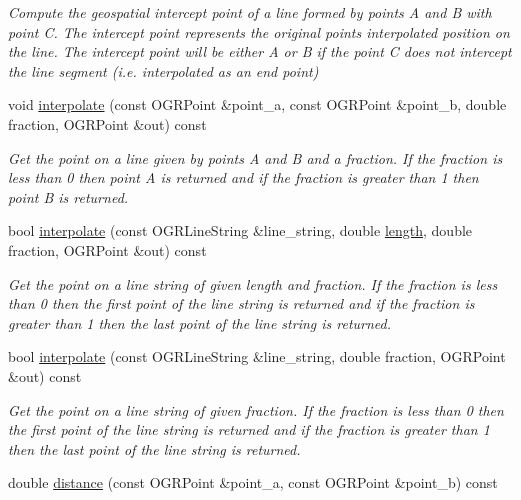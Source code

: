 \begin{DoxyCompactItemize}
\begin{DoxyCompactList}\small\item\em Compute the geospatial intercept point of a line formed by points A and B with point C. The intercept point represents the original point\textquotesingle{}s interpolated position on the line. The intercept point will be either A or B if the point C does not intercept the line segment (i.\+e. interpolated as an end point) \end{DoxyCompactList}\item 
void \hyperlink{classgeo_1_1Spatial_a01ef3e17941b265d3b21c9d3a618da18}{interpolate} (const O\+G\+R\+Point \&point\+\_\+a, const O\+G\+R\+Point \&point\+\_\+b, double fraction, O\+G\+R\+Point \&out) const 
\begin{DoxyCompactList}\small\item\em Get the point on a line given by points A and B and a fraction. If the fraction is less than 0 then point A is returned and if the fraction is greater than 1 then point B is returned. \end{DoxyCompactList}\item 
bool \hyperlink{classgeo_1_1Spatial_a4de3f6650935ef3ece0db3d19f06a5f9}{interpolate} (const O\+G\+R\+Line\+String \&line\+\_\+string, double \hyperlink{classgeo_1_1Spatial_a6bcfc529e8ab148e30cb58f243362eee}{length}, double fraction, O\+G\+R\+Point \&out) const 
\begin{DoxyCompactList}\small\item\em Get the point on a line string of given length and fraction. If the fraction is less than 0 then the first point of the line string is returned and if the fraction is greater than 1 then the last point of the line string is returned. \end{DoxyCompactList}\item 
bool \hyperlink{classgeo_1_1Spatial_a309e1932e955eee2a57d2104655e8080}{interpolate} (const O\+G\+R\+Line\+String \&line\+\_\+string, double fraction, O\+G\+R\+Point \&out) const 
\begin{DoxyCompactList}\small\item\em Get the point on a line string of given fraction. If the fraction is less than 0 then the first point of the line string is returned and if the fraction is greater than 1 then the last point of the line string is returned. \end{DoxyCompactList}\item 
double \hyperlink{classgeo_1_1Spatial_a9530b4b540b4601fa6254d2a30c17b95}{distance} (const O\+G\+R\+Point \&point\+\_\+a, const O\+G\+R\+Point \&point\+\_\+b) const 

\end{DoxyCompactItemize}
